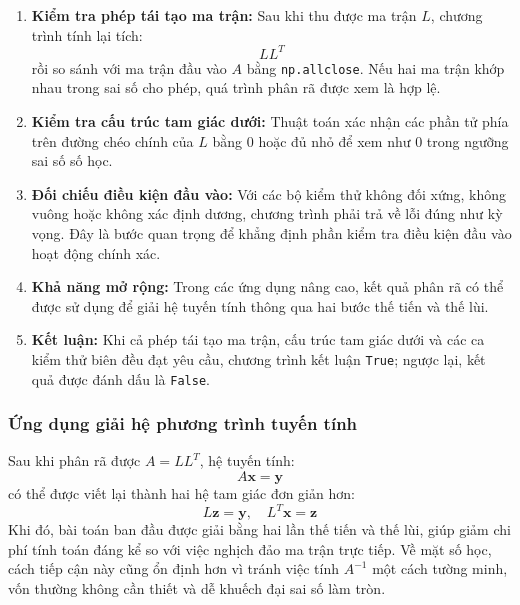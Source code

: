 \documentclass[12pt,a4paper]{article}
\begin{document}
\begin{enumerate}[label=\textbf{\alph*)}, leftmargin=*, align=left]
    \item \textbf{Kiểm tra phép tái tạo ma trận:} Sau khi thu được ma trận $L$, chương trình tính lại tích:
    \begin{equation}
    LL^T
    \end{equation}
    rồi so sánh với ma trận đầu vào $A$ bằng \texttt{np.allclose}. Nếu hai ma trận khớp nhau trong sai số cho phép, quá trình phân rã được xem là hợp lệ.\cite{ref6}

    \item \textbf{Kiểm tra cấu trúc tam giác dưới:} Thuật toán xác nhận các phần tử phía trên đường chéo chính của $L$ bằng $0$ hoặc đủ nhỏ để xem như $0$ trong ngưỡng sai số số học.

    \item \textbf{Đối chiếu điều kiện đầu vào:} Với các bộ kiểm thử không đối xứng, không vuông hoặc không xác định dương, chương trình phải trả về lỗi đúng như kỳ vọng. Đây là bước quan trọng để khẳng định phần kiểm tra điều kiện đầu vào hoạt động chính xác.

    \item \textbf{Khả năng mở rộng:}
Trong các ứng dụng nâng cao, kết quả phân rã có thể được sử dụng để giải hệ tuyến tính thông qua hai bước thế tiến và thế lùi.

    \item \textbf{Kết luận:} Khi cả phép tái tạo ma trận, cấu trúc tam giác dưới và các ca kiểm thử biên đều đạt yêu cầu, chương trình kết luận \texttt{True}; ngược lại, kết quả được đánh dấu là \texttt{False}.
\end{enumerate}

\subsubsection{Ứng dụng giải hệ phương trình tuyến tính}
Sau khi phân rã được $A = LL^T$, hệ tuyến tính:
\begin{equation}
A\mathbf{x} = \mathbf{y}
\end{equation}
có thể được viết lại thành hai hệ tam giác đơn giản hơn:
\begin{equation}
L\mathbf{z} = \mathbf{y}, \quad L^T\mathbf{x} = \mathbf{z}
\end{equation}
Khi đó, bài toán ban đầu được giải bằng hai lần thế tiến và thế lùi, giúp giảm chi phí tính toán đáng kể so với việc nghịch đảo ma trận trực tiếp. Về mặt số học, cách tiếp cận này cũng ổn định hơn vì tránh việc tính $A^{-1}$ một cách tường minh, vốn thường không cần thiết và dễ khuếch đại sai số làm tròn.
\end{document}

